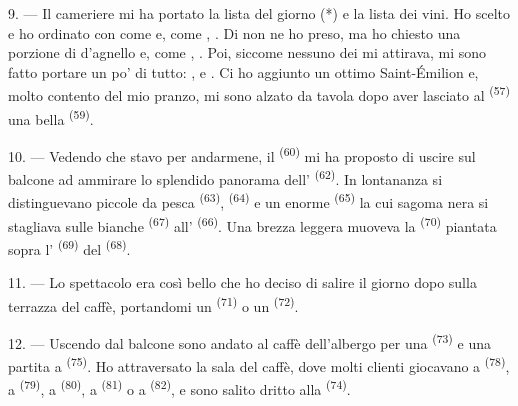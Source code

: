 \VUsaut{4.0mm}
\VUsaut{3.0mm}

9. --- Il cameriere mi ha portato la lista del giorno (*) e la lista dei vini. Ho
scelto e ho ordinato  con  come
 e, come , . Di
 non ne ho preso, ma ho chiesto una porzione di 
d'agnello e, come , . Poi, siccome
nessuno dei  mi attirava, mi sono fatto portare un po' di tutto:
,  e . Ci ho aggiunto un ottimo
 Saint-Émilion e, molto contento del mio pranzo, mi sono alzato da tavola
dopo aver lasciato al  \textsuperscript{(57)} una bella
 \textsuperscript{(59)}.

10. --- Vedendo che stavo per andarmene, il  \textsuperscript{(60)}
mi ha proposto di uscire sul balcone ad ammirare lo splendido panorama
dell' \textsuperscript{(62)}. In lontananza si distinguevano piccole
 da pesca \textsuperscript{(63)}, 
\textsuperscript{(64)} e un enorme  \textsuperscript{(65)} la
cui sagoma nera si stagliava sulle  bianche \textsuperscript{(67)}
all' \textsuperscript{(66)}. Una brezza leggera muoveva la
 \textsuperscript{(70)} piantata sopra l'
\textsuperscript{(69)} del  \textsuperscript{(68)}.

\VUsaut{3.0mm}
\VUsaut{3.0mm}

11. --- Lo spettacolo era così bello che ho deciso di salire il giorno dopo sulla
terrazza del caffè, portandomi un  \textsuperscript{(71)} o
un  \textsuperscript{(72)}.

12. --- Uscendo dal balcone sono andato al caffè dell'albergo per una
 \textsuperscript{(73)} e una partita a 
\textsuperscript{(75)}. Ho attraversato la sala del caffè, dove molti clienti giocavano
a  \textsuperscript{(78)}, a  \textsuperscript{(79)}, a
 \textsuperscript{(80)}, a  \textsuperscript{(81)} o
a  \textsuperscript{(82)}, e sono salito dritto alla  \textsuperscript{(74)}.

